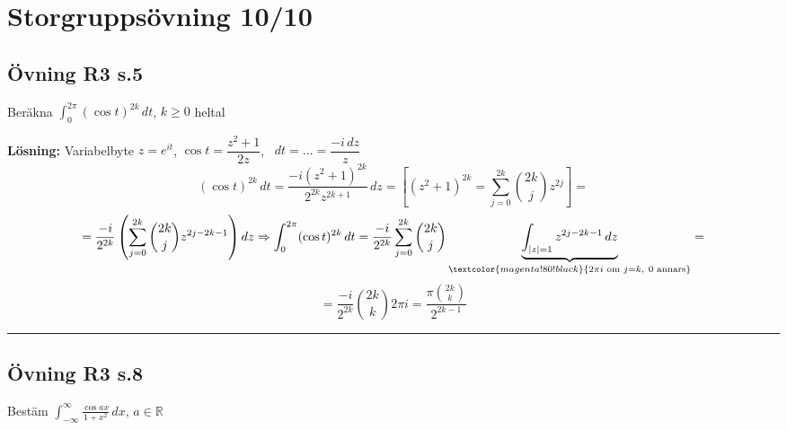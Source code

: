 \section{Storgruppsövning 10/10}
\subsection{Övning R3 s.5}
Beräkna $\displaystyle\int_0^{2\pi} (\cos t)^{2k}\,dt$, $k \ge 0$ heltal

\textbf{Lösning:} Variabelbyte $z = e^{it}$, $\cos t = \dfrac{z^2 + 1}{2z}$, \ $dt = \dots = \dfrac{-i\,dz}{z}$
\[ (\cos t)^{2k}\,dt = \frac{-i(z^2 + 1)^{2k}}{2^{2k} z^{2k+1}}\,dz = \left[ (z^2 + 1)^{2k} = \sum_{j = 0}^{2k} \binom{2k}{j} z^{2j} \right] = \]
\[ = \frac{-i}{2^{2k}}\left( \sum_{j = 0}^{2k} \binom{2k}{j} z^{2j - 2k - 1} \right) dz \Rightarrow \int_0^{2\pi} (\cos t)^{2k}\,dt = \frac{-i}{2^{2k}} \sum_{j = 0}^{2k} \binom{2k}{j} \underbrace{\int_{|z| = 1} z^{2j - 2k - 1}\,dz}_{\textcolor{magenta!80!black}{2\pi i \text{ om } j = k,\ 0 \text{ annars}}} = \]
\[ = \frac{-i}{2^{2k}} \binom{2k}{k} 2\pi i = \frac{\pi \binom{2k}{k}}{2^{2k - 1}} \]

\noindent\rule{\linewidth}{0.4pt}

\subsection{Övning R3 s.8}
Bestäm $\displaystyle\int_{-\infty}^\infty \frac{\cos ax}{1 + x^2}\,dx$, $a \in \mathbb{R}$

